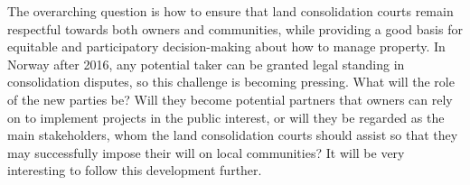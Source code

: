 
The overarching question is how to ensure that land consolidation courts remain respectful towards both owners and communities, while providing a good basis for equitable and participatory decision-making about how to manage property. In Norway after 2016, any potential taker can be granted legal standing in consolidation disputes, so this challenge is becoming pressing. What will the role of the new parties be? Will they become potential partners that owners can rely on to implement projects in the public interest, or will they be regarded as the main stakeholders, whom the land consolidation courts should assist so that they may successfully impose their will on local communities? It will be very interesting to follow this development further.


